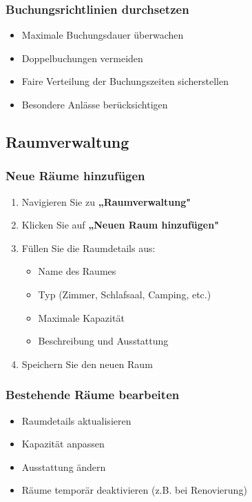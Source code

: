 \subsubsection{Buchungsrichtlinien durchsetzen}

\begin{itemize}
    \item Maximale Buchungsdauer überwachen
    \item Doppelbuchungen vermeiden
    \item Faire Verteilung der Buchungszeiten sicherstellen
    \item Besondere Anlässe berücksichtigen
\end{itemize}

\subsection{Raumverwaltung}

\subsubsection{Neue Räume hinzufügen}

\begin{enumerate}
    \item Navigieren Sie zu \textbf{„Raumverwaltung"}
    \item Klicken Sie auf \textbf{„Neuen Raum hinzufügen"}
    \item Füllen Sie die Raumdetails aus:
        \begin{itemize}
            \item Name des Raumes
            \item Typ (Zimmer, Schlafsaal, Camping, etc.)
            \item Maximale Kapazität
            \item Beschreibung und Ausstattung
        \end{itemize}
    \item Speichern Sie den neuen Raum
\end{enumerate}

\subsubsection{Bestehende Räume bearbeiten}

\begin{itemize}
    \item Raumdetails aktualisieren
    \item Kapazität anpassen
    \item Ausstattung ändern
    \item Räume temporär deaktivieren (z.B. bei Renovierung)
\end{itemize}

